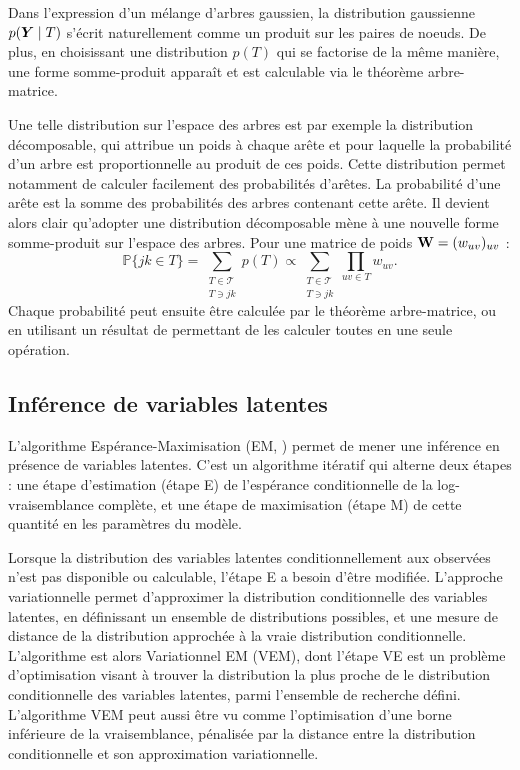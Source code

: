 Dans l'expression d'un mélange d'arbres gaussien, la distribution gaussienne $p({\boldsymbol{Y}}\mid T)$ s'écrit naturellement comme un produit sur les paires de noeuds. De plus, en choisissant une distribution $p(T)$ qui se factorise de la même manière, une forme somme-produit apparaît et est calculable via le théorème arbre-matrice.

 Une telle distribution sur l'espace des arbres est par exemple la distribution décomposable, qui attribue un poids à chaque arête et pour laquelle la probabilité d'un arbre est proportionnelle au produit de ces poids. Cette distribution permet notamment de calculer facilement des probabilités d'arêtes. La probabilité d'une arête est la somme des probabilités des arbres contenant cette arête. Il devient alors clair qu'adopter une distribution décomposable mène à une nouvelle forme somme-produit sur l'espace des arbres. Pour une matrice de poids ${\bf W}=(w_{uv})_{uv}$ :
$$\mathds{P}\{jk\in T\} = \sum_{\substack{T\in \mathcal{T} \\ T\ni jk}} p(T) \propto \sum_{\substack{T\in \mathcal{T} \\ T\ni jk}} \prod_{uv \in T} w_{uv}.$$
Chaque probabilité peut ensuite être calculée par le théorème arbre-matrice, ou en utilisant un résultat de \citet{kirshner} permettant de les calculer toutes en une seule opération.

 
\subsection*{Inférence de variables latentes}
L'algorithme Espérance-Maximisation (EM, \citet{DLR77}) permet de mener une inférence en présence de variables latentes. C'est un algorithme itératif qui alterne deux étapes : une étape d'estimation (étape E) de l'espérance conditionnelle de la log-vraisemblance complète, et une étape de maximisation (étape M) de cette quantité en les paramètres du modèle.

Lorsque la distribution des variables latentes conditionnellement aux observées n'est pas disponible ou calculable, l'étape E a besoin d'être modifiée. L'approche variationnelle permet d'approximer la distribution conditionnelle des variables latentes, en définissant un ensemble de distributions possibles, et une mesure de distance de la distribution approchée à la vraie distribution conditionnelle. L'algorithme est alors Variationnel EM (VEM), dont l'étape VE est un problème d'optimisation visant à trouver la distribution la plus proche de le distribution conditionnelle des variables latentes, parmi l'ensemble de recherche défini. L'algorithme VEM peut aussi être vu comme l'optimisation d'une borne inférieure de la vraisemblance, pénalisée par la distance entre la distribution conditionnelle et son approximation variationnelle.\\


